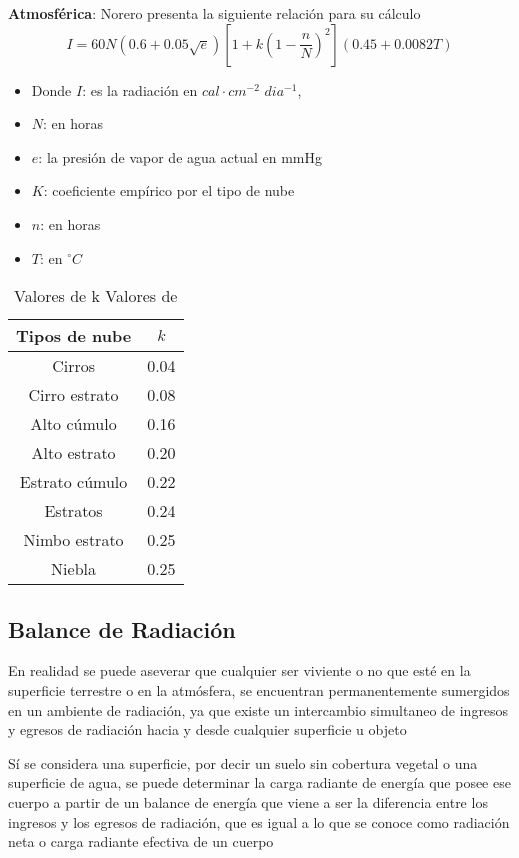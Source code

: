 \textbf{Atmosférica}: Norero presenta la siguiente relación para su cálculo
\begin{equation}
    I = 60N\left(0.6 +0.05 \sqrt{e} \right)\left[1 + k\left(1 - \frac{n}{N}\right)^2\right]\left(0.45 + 0.0082T \right)
\end{equation}
\begin{notation}
    \begin{itemize}
        \item Donde $I$: es la radiación en $cal\cdot cm^{-2}$ $dia^{-1}$,
        \item $N$: en horas
        \item $e$: la presión de vapor de agua actual en mmHg
        \item $K$: coeficiente empírico por el tipo de nube
        \item $n$: en horas
        \item $T$: en $^{\circ}C$
    \end{itemize}
\end{notation}
\begin{table}[h!]
    \centering
    \begin{tabular}{@{}cc@{}}
    \toprule
    Tipos de nube  & $k$  \\ \midrule
    Cirros         & 0.04 \\
    Cirro estrato  & 0.08 \\
    Alto cúmulo    & 0.16 \\
    Alto estrato   & 0.20 \\
    Estrato cúmulo & 0.22 \\
    Estratos       & 0.24 \\
    Nimbo estrato  & 0.25 \\
    Niebla         & 0.25 \\ \bottomrule
    \end{tabular}
    \caption{Valores de k Valores de}
    \label{tabma17}
\end{table}
\subsection{Balance de Radiación}
En realidad se puede aseverar que cualquier ser viviente o no que esté en la superficie terrestre o en la atmósfera, se encuentran permanentemente sumergidos en un ambiente de radiación, ya que existe un intercambio simultaneo de ingresos y egresos de radiación hacia y desde cualquier superficie u objeto

Sí se considera una superficie, por decir un suelo sin cobertura vegetal o una superficie de agua, se puede determinar la carga radiante de energía que posee ese cuerpo a partir de un balance de energía que viene a ser la diferencia entre los ingresos y los egresos de radiación, que es igual a lo que se conoce como radiación neta o carga radiante efectiva de un cuerpo

